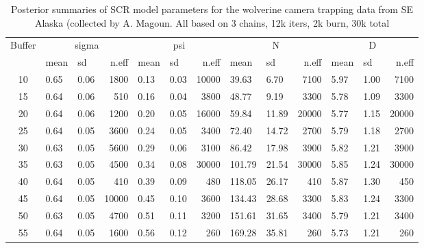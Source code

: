 \begin{table}
\caption{
Posterior summaries of SCR model parameters for the wolverine camera
trapping data from SE Alaska (collected by A. Magoun.
All based on 3 chains, 12k iters, 2k burn, 30k total
}
{\small
\begin{tabular}{cllrllrllrllr}
Buffer &\multicolumn{3}{c}{sigma} & \multicolumn{3}{c}{psi} &
\multicolumn{3}{c}{N} & \multicolumn{3}{c}{D} \\
   & mean &	sd	&n.eff&	mean&	sd	&n.eff&	mean&	sd   &n.eff&	mean&	sd&	n.eff \\
10&	0.65&	0.06&	1800&	0.13&	0.03&	10000&	39.63&	6.70& 7100&	5.97&	1.00&	7100 \\
15&	0.64&	0.06&	510&	0.16&	0.04&	3800&	48.77&	9.19&	3300&	5.78&	1.09&	3300\\
20&	0.64&	0.06&	1200&	0.20&	0.05&	16000&	59.84&	11.89&	20000&	5.77&	1.15&	20000\\
25&	0.64&	0.05&	3600&	0.24&	0.05&	3400&	72.40&	14.72&	2700&	5.79&	1.18&	2700\\
30&	0.63&	0.05&	5600&	0.29&	0.06&	3100&	86.42&	17.98&	3900&	5.82&	1.21&	3900\\
35&	0.63&	0.05&	4500&	0.34&	0.08&	30000&	101.79&	21.54&	30000&	5.85&	1.24&	30000\\
40&	0.64&	0.05&	410&	0.39&	0.09&	480&	118.05&	26.17&	410&	5.87&	1.30&	450\\
45&	0.64&	0.05&	10000&	0.45&	0.10&	3600&	134.43&	28.68&	3300&	5.83&	1.24&	3300\\
50&	0.63&	0.05&	4700&	0.51&	0.11&	3200&	151.61&	31.65&	3400&	5.79&	1.21&	3400\\
55&	0.64&	0.05&	1600&	0.56&	0.12&	260&	169.28&	35.81&	260&	5.73&	1.21&	260\\
\end{tabular}
}
\end{table}




